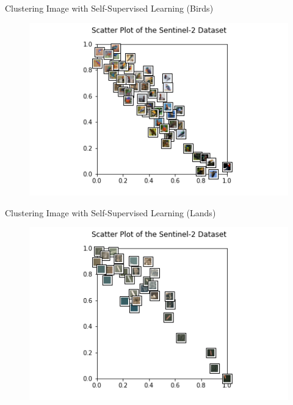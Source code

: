 \documentclass{beamer}
\begin{document}
	\begin{frame}[t]{Clustering Image with Self-Supervised Learning (Birds)}
		\begin{figure}
			\centering
			\includegraphics[scale=0.7]{birds.png}
		\end{figure}
	\end{frame}
	
	\begin{frame}[t]{Clustering Image with Self-Supervised Learning (Lands)}
		\begin{figure}
			\centering
			\includegraphics[scale=0.7]{land.png}
		\end{figure}
	\end{frame}
\end{document}
